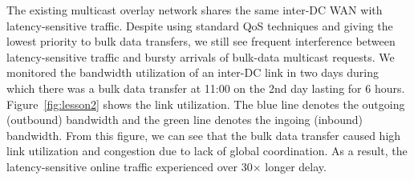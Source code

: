 



The existing multicast overlay network shares the same inter-DC WAN
with latency-sensitive traffic.
Despite using standard QoS techniques and giving the lowest priority to
bulk data transfers, we still see frequent interference between
latency-sensitive traffic and bursty arrivals of bulk-data multicast
requests. We monitored the bandwidth utilization of an inter-DC
link in two days during which there was a bulk data transfer at 11:00 on the 2nd day lasting for 6 hours. Figure~\ref{fig:lesson2} shows the link utilization. The blue line denotes the outgoing (outbound) bandwidth and the green line denotes the ingoing (inbound) bandwidth.
From this figure, we can see that the bulk data transfer caused high link utilization and congestion due
to lack of global coordination. As a result, the latency-sensitive online traffic experienced over
30$\times$ longer delay.

